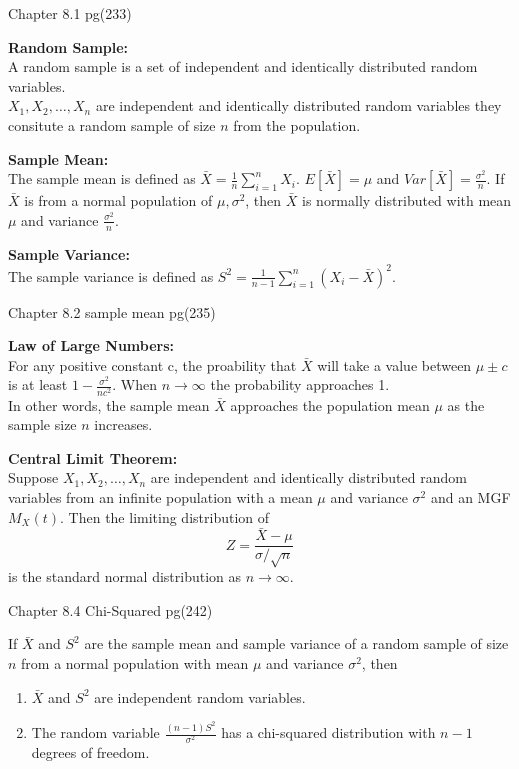 \documentclass[answers,12pt,addpoints]{exam}
\begin{document}
Chapter 8.1 pg(233)\\
\begin{definition}
    \textbf{Random Sample:}\\
    A random sample is a set of independent and identically distributed random variables.\\
    $X_1, X_2, \ldots, X_n$ are independent and identically distributed random variables they consitute a random sample of size $n$ from the population.\\
\end{definition}
\begin{definition}
    \textbf{Sample Mean:}\\
    The sample mean is defined as $\bar{X} = \frac{1}{n}\sum_{i=1}^{n}X_i$.
    $E[\bar{X}] = \mu$ and $Var[\bar{X}] = \frac{\sigma^2}{n}$.
    If $\bar{X}$ is from a normal population of $\mu, \sigma^2$, then $\bar{X}$ is normally distributed with mean $\mu$ and variance $\frac{\sigma^2}{n}$.
\end{definition}
\begin{definition}
    \textbf{Sample Variance:}\\
    The sample variance is defined as $S^2 = \frac{1}{n-1}\sum_{i=1}^{n}(X_i - \bar{X})^2$.
\end{definition}
Chapter 8.2 sample mean pg(235)\\
\begin{definition}
    \textbf{Law of Large Numbers:}\\
    For any positive constant c, the proability that $\bar{X}$ will take a value between $\mu \pm c$ is at least $1 - \frac{\sigma^2}{nc^2}$.
    When $n \to \infty$ the probability approaches 1.\\
    In other words, the sample mean $\bar{X}$ approaches the population mean $\mu$ as the sample size $n$ increases.
\end{definition}
\begin{definition}
    \textbf{Central Limit Theorem:}\\
    Suppose $X_1, X_2, \ldots, X_n$ are independent and identically distributed random variables from an infinite population with a mean $\mu$ and variance $\sigma^2$ and an MGF $M_X(t)$. Then the limiting distribution of $$Z = \frac{\bar{X} - \mu}{\sigma/\sqrt{n}}$$ is the standard normal distribution as $n \to \infty$.\\

\end{definition}
Chapter 8.4 Chi-Squared pg(242)\\
\begin{theorem}
    If $\bar{X}$ and $S^2$ are the sample mean and sample variance of a random sample of size $n$ from a normal population with mean $\mu$ and variance $\sigma^2$, then
    \begin{enumerate}
        \item $\bar{X}$ and $S^2$ are independent random variables.
        \item The random variable $\frac{(n-1)S^2}{\sigma^2}$ has a chi-squared distribution with $n-1$ degrees of freedom.
    \end{enumerate}
\end{theorem}
\end{document}
